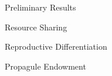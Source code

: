 \begin{block}{Preliminary Results}
\begin{alertblock}{Resource Sharing}
  
\end{alertblock}
\begin{alertblock}{Reproductive Differentiation}
  
\end{alertblock}
\begin{alertblock}{Propagule Endowment}
  
\end{alertblock}
\end{block}
